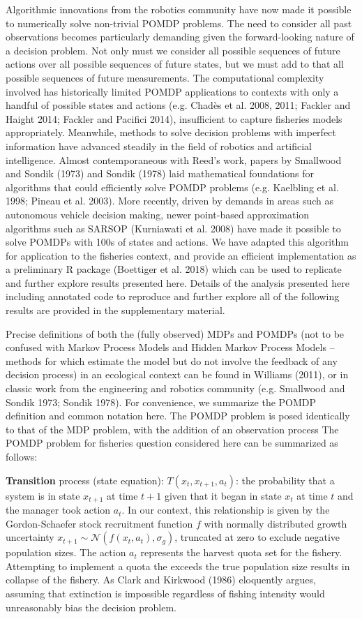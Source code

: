 \documentclass[3p]{elsarticle} %
\begin{document}
Algorithmic innovations from the robotics community have now made it
possible to numerically solve non-trivial POMDP problems. The need to
consider all past observations becomes particularly demanding given the
forward-looking nature of a decision problem. Not only must we consider
all possible sequences of future actions over all possible sequences of
future states, but we must add to that all possible sequences of future
measurements. The computational complexity involved has historically
limited POMDP applications to contexts with only a handful of possible
states and actions (e.g. Chadès et al. 2008, 2011; Fackler and Haight
2014; Fackler and Pacifici 2014), insufficient to capture fisheries
models appropriately. Meanwhile, methods to solve decision problems with
imperfect information have advanced steadily in the field of robotics
and artificial intelligence. Almost contemporaneous with Reed's work,
papers by Smallwood and Sondik (1973) and Sondik (1978) laid
mathematical foundations for algorithms that could efficiently solve
POMDP problems (e.g. Kaelbling et al. 1998; Pineau et al. 2003). More
recently, driven by demands in areas such as autonomous vehicle decision
making, newer point-based approximation algorithms such as SARSOP
(Kurniawati et al. 2008) have made it possible to solve POMDPs with 100s
of states and actions. We have adapted this algorithm for application to
the fisheries context, and provide an efficient implementation as a
preliminary R package (Boettiger et al. 2018) which can be used to
replicate and further explore results presented here. Details of the
analysis presented here including annotated code to reproduce and
further explore all of the following results are provided in the
supplementary material.

Precise definitions of both the (fully observed) MDPs and POMDPs (not to
be confused with Markov Process Models and Hidden Markov Process Models
-- methods for which estimate the model but do not involve the feedback
of any decision process) in an ecological context can be found in
Williams (2011), or in classic work from the engineering and robotics
community (e.g. Smallwood and Sondik 1973; Sondik 1978). For
convenience, we summarize the POMDP definition and common notation here.
The POMDP problem is posed identically to that of the MDP problem, with
the addition of an observation process The POMDP problem for fisheries
question considered here can be summarized as follows:

\textbf{Transition} process (state equation): \(T(x_t, x_{t+1}, a_t)\):
the probability that a system is in state \(x_{t+1}\) at time \(t+1\)
given that it began in state \(x_t\) at time \(t\) and the manager took
action \(a_t\). In our context, this relationship is given by the
Gordon-Schaefer stock recruitment function \(f\) with normally
distributed growth uncertainty
\(x_{t+1} \sim \mathcal{N}(f(x_t,a_t), \sigma_g)\), truncated at zero to
exclude negative population sizes. The action \(a_t\) represents the
harvest quota set for the fishery. Attempting to implement a quota the
exceeds the true population size results in collapse of the fishery. As
Clark and Kirkwood (1986) eloquently argues, assuming that extinction is
impossible regardless of fishing intensity would unreasonably bias the
decision problem.
\end{document}
